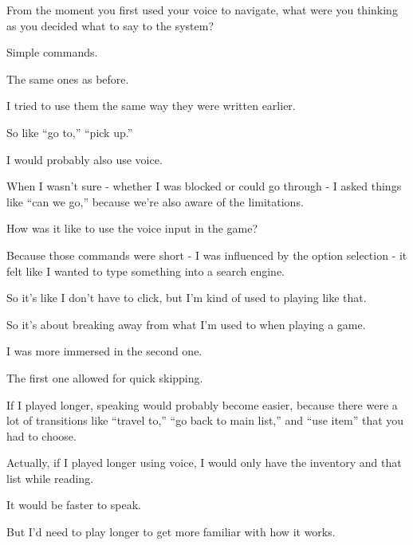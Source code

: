 \begin{QandA}


   \item From the moment you first used your voice to navigate, what were you thinking as you decided what to say to the system?

         \begin{answered}
            Simple commands.

            The same ones as before.

            I tried to use them the same way they were written earlier.

            So like “go to,” “pick up.”

            I would probably also use voice.

            When I wasn’t sure - whether I was blocked or could go through - I asked things like “can we go,” because we’re also aware of the limitations.
         \end{answered}

    \item How was it like to use the voice input in the game?
         \begin{answered}
            Because those commands were short - I was influenced by the option selection - it felt like I wanted to type something into a search engine.

            So it’s like I don’t have to click, but I’m kind of used to playing like that.

            So it’s about breaking away from what I’m used to when playing a game.

            I was more immersed in the second one.

            The first one allowed for quick skipping.

            If I played longer, speaking would probably become easier, because there were a lot of transitions like “travel to,” “go back to main list,” and “use item” that you had to choose.

            Actually, if I played longer using voice, I would only have the inventory and that list while reading.

            It would be faster to speak.

            But I’d need to play longer to get more familiar with how it works.
         \end{answered}


\end{QandA}




